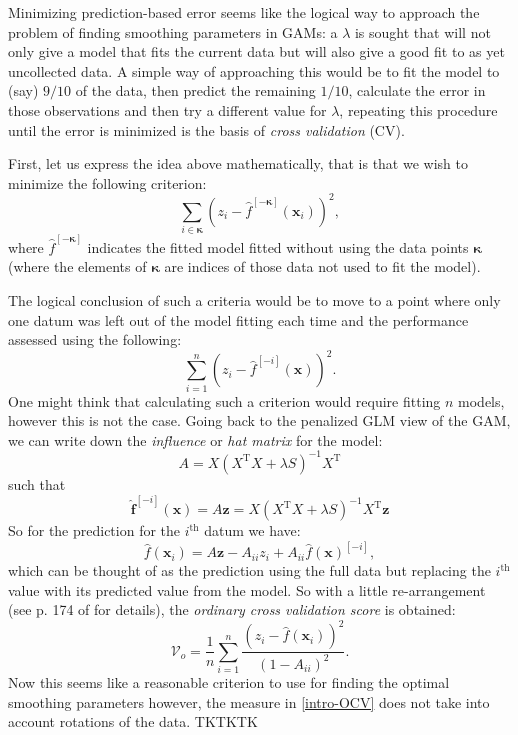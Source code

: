 Minimizing prediction-based error seems like the logical way to approach the problem of finding smoothing parameters in GAMs: a $\lambda$ is sought that will not only give a model that fits the current  data but will also give a good fit to as yet uncollected data. A simple way of approaching this would be to fit the model to (say) $9/10$ of the data, then predict the remaining $1/10$, calculate the error in those observations and then try a different value for $\lambda$, repeating this procedure until the error is minimized is the basis of \textit{cross validation} (CV).

First, let us express the idea above mathematically, that is that we wish to minimize the following criterion:
\begin{equation*}
\sum_{i \in \bm{\kappa}} (z_i - \hat{f}^{[-\bm{\kappa}]}(\mathbf{x}_i))^2,
\end{equation*}
where $\hat{f}^{[-\bm{\kappa}]}$ indicates the fitted model fitted without using the data points $\bm{\kappa}$ (where the elements of $\bm{\kappa}$ are indices of those data not used to fit the model).

The logical conclusion of such a criteria would be to move to a point where only one datum was left out of the model fitting each time and the performance assessed using the following:
\begin{equation}
\sum_{i=1}^n (z_i - \hat{f}^{[-i]}(\mathbf{x}))^2.
\end{equation}
One might think that calculating such a criterion would require fitting $n$ models, however this is not the case. Going back to the penalized GLM view of the GAM, we can write down the \textit{influence} or \textit{hat matrix} for the model:
\begin{equation*}
A = X(X^\text{T}X + \lambda S)^{-1}X^\text{T}
\end{equation*}
such that
\begin{equation*}
\mathbf{\hat{f}}^{[-i]}(\mathbf{x}) = A\mathbf{z} = X(X^\text{T}X + \lambda S)^{-1}X^\text{T}\mathbf{z}
\end{equation*}
So for the prediction for the $i^\text{th}$ datum we have:
\begin{equation*}
\hat{f}(\mathbf{x}_i) = A\mathbf{z} - A_{ii}z_i + A_{ii}\hat{f}(\mathbf{x})^{[-i]},
\end{equation*}
which can be thought of as the prediction using the full data but replacing the $i^\text{th}$ value with its predicted value from the model. So with a little re-arrangement (see p. 174 of \cite{simonbook} for details), the \textit{ordinary cross validation score} is obtained:
\begin{equation}
\mathcal{V}_o = \frac{1}{n} \sum_{i=1}^n \frac{(z_i - \hat{f}(\mathbf{x}_i))^2}{(1-A_{ii})^2}.
\label{intro-OCV}
\end{equation}
Now this seems like a reasonable criterion to use for finding the optimal smoothing parameters however, the measure in \ref{intro-OCV} does not take into account rotations of the data. TKTKTK


